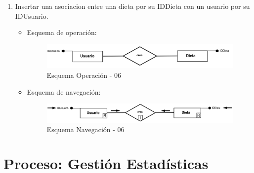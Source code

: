 \documentclass[a4paper,12pt]{report}
\begin{document}
\begin{enumerate}
\item Insertar una asociacion entre una dieta por su IDDieta con un usuario por su IDUsuario.
\begin{itemize}
\item Esquema de operación:
\begin{figure}[!htp]
\centering
\includegraphics[width=0.9\linewidth]{./operaciones/img/Dietas/06_ope.png}
\caption{Esquema Operación - 06}
\label{fig:ope06}
\medskip
\footnotesize
{}
\end{figure}
\item Esquema de navegación:
\begin{figure}[!htp]
\centering
\includegraphics[width=0.9\linewidth]{./operaciones/img/Dietas/06_nav.png}
\caption{Esquema Navegación - 06}
\label{fig:nave06}
\medskip
\footnotesize
{}
\end{figure}
\end{itemize}
\end{enumerate}
\section{Proceso: Gestión Estadísticas}
\label{sec-7-6}
\end{document}
